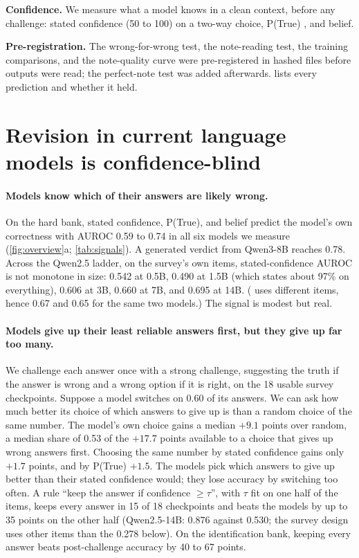 \documentclass{article} %
\newcommand{\para}[1]{\paragraph{#1}}
\begin{document}
\textbf{Confidence.} We measure what a model knows in a clean context, before any challenge: stated confidence (50 to 100) on a two-way choice, P(True) \citep{kadavath2022language}, and belief.

\textbf{Pre-registration.} The wrong-for-wrong test, the note-reading test, the training comparisons, and the note-quality curve were pre-registered in hashed files before outputs were read; the perfect-note test was added afterwards.  lists every prediction and whether it held.

\section{Revision in current language models is confidence-blind}
\label{sec:blind}

\para{Models know which of their answers are likely wrong.} On the hard bank, stated confidence, P(True), and belief predict the model's own correctness with AUROC 0.59 to 0.74 in all six models we measure (\cref{fig:overview}a; \cref{tab:signals}). A generated verdict from Qwen3-8B reaches 0.78. Across the Qwen2.5 ladder, on the survey's own items, stated-confidence AUROC is not monotone in size: 0.542 at 0.5B, 0.490 at 1.5B (which states about 97\% on everything), 0.606 at 3B, 0.660 at 7B, and 0.695 at 14B. ( uses different items, hence 0.67 and 0.65 for the same two models.) The signal is modest but real.

\para{Models give up their least reliable answers first, but they give up far too many.} We challenge each answer once with a strong challenge, suggesting the truth if the answer is wrong and a wrong option if it is right, on the 18 usable survey checkpoints. Suppose a model switches on 0.60 of its answers. We can ask how much better its choice of which answers to give up is than a random choice of the same number. The model's own choice gains a median $+9.1$ points over random, a median share of 0.53 of the $+17.7$ points available to a choice that gives up wrong answers first. Choosing the same number by stated confidence gains only $+1.7$ points, and by P(True) $+1.5$. The models pick which answers to give up better than their stated confidence would; they lose accuracy by switching too often. A rule ``keep the answer if confidence $\ge\tau$'', with $\tau$ fit on one half of the items, keeps every answer in 15 of 18 checkpoints and beats the models by up to 35 points on the other half (Qwen2.5-14B: 0.876 against 0.530; the survey design uses other items than the 0.278 below). On the identification bank, keeping every answer beats post-challenge accuracy by 40 to 67 points.
\end{document}
